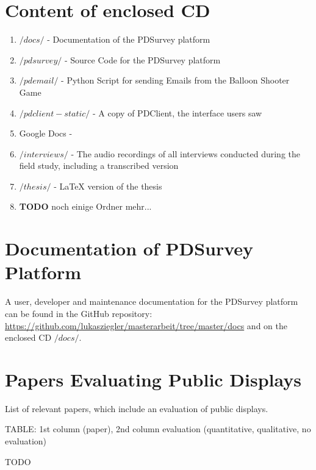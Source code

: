\section{Content of enclosed CD}
\label{appendix:cd-contents}


    \begin{enumerate}
    \item $/docs/$ - Documentation of the PDSurvey platform
    \item $/pdsurvey/$ - Source Code for the PDSurvey platform
    \item $/pdemail/$ - Python Script for sending Emails from the Balloon Shooter Game
    \item $/pdclient-static/$ - A copy of PDClient, the interface users saw
    \item Google Docs - 
    \item $/interviews/$ - The audio recordings of all interviews conducted during the field study, including a transcribed version
    \item $/thesis/$ - LaTeX version of the thesis
    \item \textbf{TODO} noch einige Ordner mehr...
    \end{enumerate}



\section{Documentation of PDSurvey Platform}
\label{appendix:documentation}

  A user, developer and maintenance documentation for the PDSurvey platform can be found in the GitHub repository: \url{https://github.com/lukasziegler/masterarbeit/tree/master/docs} and on the enclosed CD $/docs/$.



\clearpage
\section{Papers Evaluating Public Displays}
  
  List of relevant papers, which include an evaluation of public displays.

  TABLE: 1st column (paper), 2nd column evaluation (quantitative, qualitative, no evaluation)

  TODO



